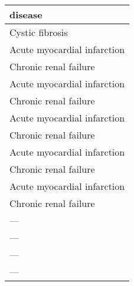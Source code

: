 \begin{tabular}{l}
  \toprule
 disease \\ 
  \midrule
  Cystic fibrosis \\ 
  Acute myocardial infarction \\ 
  Chronic renal failure \\ 
  Acute myocardial infarction \\ 
  Chronic renal failure \\ 
  Acute myocardial infarction \\ 
  Chronic renal failure \\ 
  Acute myocardial infarction \\ 
  Chronic renal failure \\ 
  Acute myocardial infarction \\ 
  Chronic renal failure \\ 
  --- \\ 
  --- \\ 
  --- \\ 
  --- \\ 
   \bottomrule
\end{tabular}
